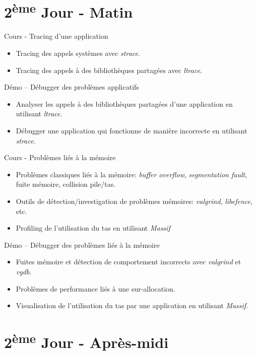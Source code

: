 \documentclass[a4paper,12pt,obeyspaces,spaces,hyphens]{article}
\begin{document}
\section{2\textsuperscript{ème} Jour - Matin}

\feagendatwocolumn
{Cours - Tracing d'une application}
{
  \begin{itemize}
  \item Tracing des appels systèmes avec {\em strace}.
  \item Tracing des appels à des bibliothèques partagées avec {\em ltrace}.
  \end{itemize}
}
{Démo – Débugger des problèmes applicatifs}
{
  \begin{itemize}
  \item Analyser les appels à des bibliothèques partagées d'une
    application en utilisant {\em ltrace}.
  \item Débugger une application qui fonctionne de manière incorrecte
    en utilisant {\em strace}.
  \end{itemize}
}

\feagendatwocolumn
{Cours - Problèmes liés à la mémoire}
{
  \begin{itemize}
  \item Problèmes classiques liés à la mémoire: {\em buffer overflow},
    {\em segmentation fault}, fuite mémoire, collision pile/tas.
  \item Outils de détection/investigation de problèmes mémoires: {\em
      valgrind}, {\em libefence}, etc.
  \item Profiling de l'utilisation du tas en utilisant {\em Massif}
  \end{itemize}
}
{Démo – Débugger des problèmes liés à la mémoire}
{
  \begin{itemize}
  \item Fuites mémoire et détection de comportement incorrects avec
    {\em valgrind} et {\em vgdb}.
  \item Problèmes de performance liés à une sur-allocation.
  \item Visualisation de l'utilisation du tas par une application en
    utilisant {\em Massif}.
  \end{itemize}
}

\section{2\textsuperscript{ème} Jour - Après-midi}
\end{document}
